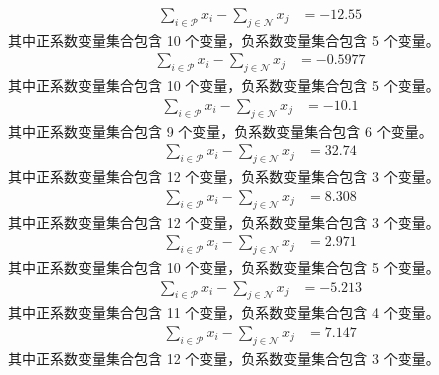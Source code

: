 \documentclass[a4paper,11pt]{article}
\begin{document}
\begin{align}
\sum_{i \in \mathcal{P}} x_i - \sum_{j \in \mathcal{N}} x_j &= -12.55 \nonumber
\end{align}
其中正系数变量集合包含 10 个变量，负系数变量集合包含 5 个变量。\\[0.3em]

\begin{align}
\sum_{i \in \mathcal{P}} x_i - \sum_{j \in \mathcal{N}} x_j &= -0.5977 \nonumber
\end{align}
其中正系数变量集合包含 10 个变量，负系数变量集合包含 5 个变量。\\[0.3em]

\begin{align}
\sum_{i \in \mathcal{P}} x_i - \sum_{j \in \mathcal{N}} x_j &= -10.1 \nonumber
\end{align}
其中正系数变量集合包含 9 个变量，负系数变量集合包含 6 个变量。\\[0.3em]

\begin{align}
\sum_{i \in \mathcal{P}} x_i - \sum_{j \in \mathcal{N}} x_j &= 32.74 \nonumber
\end{align}
其中正系数变量集合包含 12 个变量，负系数变量集合包含 3 个变量。\\[0.3em]

\begin{align}
\sum_{i \in \mathcal{P}} x_i - \sum_{j \in \mathcal{N}} x_j &= 8.308 \nonumber
\end{align}
其中正系数变量集合包含 12 个变量，负系数变量集合包含 3 个变量。\\[0.3em]

\begin{align}
\sum_{i \in \mathcal{P}} x_i - \sum_{j \in \mathcal{N}} x_j &= 2.971 \nonumber
\end{align}
其中正系数变量集合包含 10 个变量，负系数变量集合包含 5 个变量。\\[0.3em]

\begin{align}
\sum_{i \in \mathcal{P}} x_i - \sum_{j \in \mathcal{N}} x_j &= -5.213 \nonumber
\end{align}
其中正系数变量集合包含 11 个变量，负系数变量集合包含 4 个变量。\\[0.3em]

\begin{align}
\sum_{i \in \mathcal{P}} x_i - \sum_{j \in \mathcal{N}} x_j &= 7.147 \nonumber
\end{align}
其中正系数变量集合包含 12 个变量，负系数变量集合包含 3 个变量。\\[0.3em]
\end{document}

